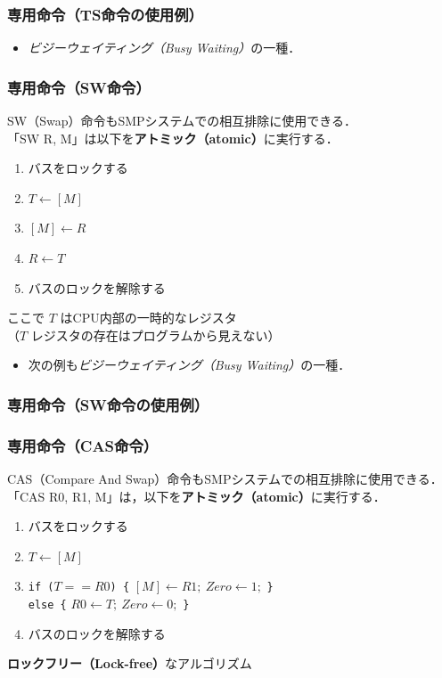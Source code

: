 \documentclass[unicode,handout]{beamer}                   %
\begin{document}
\begin{frame}
  \frametitle{専用命令（TS命令の使用例）}
  \begin{itemize}
  \item \emph{ビジーウェイティング（Busy Waiting）}の一種．
  \end{itemize}
  \vfill
\end{frame}

\begin{frame}
  \frametitle{専用命令（SW命令）}
  SW（Swap）命令もSMPシステムでの相互排除に使用できる．\\
  「SW  R, M」は以下を{\bf アトミック（atomic）}に実行する．
  \begin{enumerate}
  \item[1.] バスをロックする
  \item[2.] $T \leftarrow [M]$
  \item[3.] $[M] \leftarrow R$
  \item[4.] $R \leftarrow T$
  \item[5.] バスのロックを解除する
  \end{enumerate}
  ここで $T$ はCPU内部の一時的なレジスタ\\
  （$T$ レジスタの存在はプログラムから見えない）
  \vfill
  \begin{itemize}
  \item 次の例も\emph{ビジーウェイティング（Busy Waiting）}の一種．
  \end{itemize}
  \vfill
\end{frame}

\begin{frame}
  \frametitle{専用命令（SW命令の使用例）}
  \vfill
\end{frame}

\begin{frame}
  \frametitle{専用命令（CAS命令）}
  CAS（Compare And Swap）命令もSMPシステムでの相互排除に使用できる．
  「CAS  R0, R1, M」は，以下を{\bf アトミック（atomic）}に実行する．
  \begin{enumerate}
  \item[1.] バスをロックする
  \item[2.] $T \leftarrow [M]$
  \item[3.] {\tt if ($T==R0$) \{} $[M] \leftarrow R1;~ Zero \leftarrow 1;$
    {\tt \} \\ else \{} $R0 \leftarrow T;~  Zero \leftarrow 0;$ {\tt \}}
  \item[4.] バスのロックを解除する
  \end{enumerate}
  \vfill
  {\bf ロックフリー（Lock-free）}なアルゴリズム
  \vfill
\end{frame}
\end{document}
